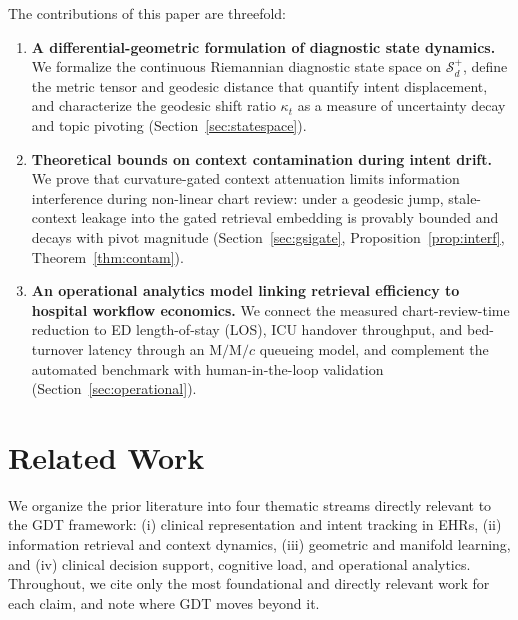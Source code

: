 \documentclass[11pt]{article}
\begin{document}
The contributions of this paper are threefold:
\begin{enumerate}
  \item \textbf{A differential-geometric formulation of diagnostic state dynamics.} We formalize the continuous Riemannian diagnostic state space on $\mathcal{S}_d^+$, define the metric tensor and geodesic distance that quantify intent displacement, and characterize the geodesic shift ratio $\kappa_t$ as a measure of uncertainty decay and topic pivoting (Section~\ref{sec:statespace}).
  \item \textbf{Theoretical bounds on context contamination during intent drift.} We prove that curvature-gated context attenuation limits information interference during non-linear chart review: under a geodesic jump, stale-context leakage into the gated retrieval embedding is provably bounded and decays with pivot magnitude (Section~\ref{sec:gsigate}, Proposition~\ref{prop:interf}, Theorem~\ref{thm:contam}).
  \item \textbf{An operational analytics model linking retrieval efficiency to hospital workflow economics.} We connect the measured chart-review-time reduction to ED length-of-stay (LOS), ICU handover throughput, and bed-turnover latency through an $\text{M/M}/c$ queueing model, and complement the automated benchmark with human-in-the-loop validation (Section~\ref{sec:operational}).
\end{enumerate}

\section{Related Work}
\label{sec:related}

We organize the prior literature into four thematic streams directly relevant to the GDT framework: (i) clinical representation and intent tracking in EHRs, (ii) information retrieval and context dynamics, (iii) geometric and manifold learning, and (iv) clinical decision support, cognitive load, and operational analytics. Throughout, we cite only the most foundational and directly relevant work for each claim, and note where GDT moves beyond it.
\end{document}
